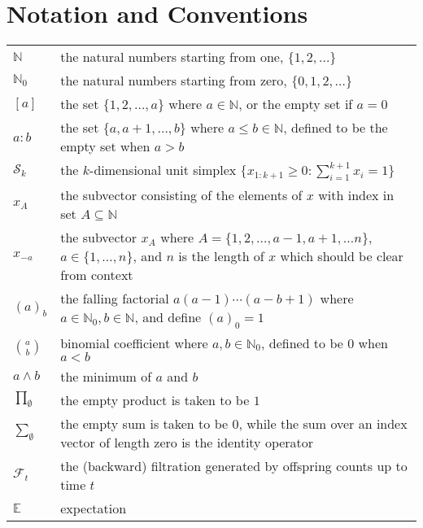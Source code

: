 \documentclass[oneside]{scrbook} %
\newcommand{\seb}[1]{\xspace\textcolor{red}{#1}\xspace} %
\theoremstyle{definition}
\newcommand{\E}{\mathbb{E}}
\newcommand{\1}[1]{\mathbbm{1}_{#1}} %
\begin{document}
\chapter{Notation and Conventions}

\begin{longtable}{p{} p{}}
$\mathbb{N}$ & the natural numbers starting from one, $\{1,2,\dots \}$ \\
$\mathbb{N}_0$ & the natural numbers starting from zero, $\{0,1,2,\dots \}$ \\
$[a]$ & the set $\{1,2,\dots,a\}$ where $a\in\mathbb{N}$, or the empty set if $a=0$ \\
$a:b$ & the set $\{a,a+1,\dots,b\}$ where $a \leq b \in\mathbb{N}$, defined to be the empty set when $a>b$ \\
$\mathcal{S}_k$ & the $k$-dimensional unit simplex $\{ x_{1:k+1} \geq 0 : \sum_{i=1}^{k+1} x_i = 1 \}$ \\
$x_A$ & the subvector consisting of the elements of $x$ with index in set $A\subseteq\mathbb{N}$ \\
$x_{-a}$ & the subvector $x_A$ where $A = \{1,2, \dots, a-1, a+1, \dots n\}$, $a\in\{1,\dots,n\}$, and $n$ is the length of $x$ which should be clear from context \\
$(a)_b$ & the falling factorial $a (a-1) \cdots (a-b+1)$ 
    where $a \in \mathbb{N}_0, b \in \mathbb{N}$, and define $(a)_0 = 1$ \\ 
$\binom{a}{b}$ & binomial coefficient where $a,b \in \mathbb{N}_0$, defined to be $0$ when $a<b$ \\
$a \wedge b$ & the minimum of $a$ and $b$ \\
$\prod_{\emptyset}$ & the empty product is taken to be $1$ \\
$\sum_{\emptyset}$ & the empty sum is taken to be $0$, while the sum over
    an index vector of length zero is the identity operator \\
$\mathcal{F}_{t}$ & the (backward) filtration generated by offspring counts 
    up to time $t$ \\
$\E$ & expectation \\

\end{longtable}
\end{document}
